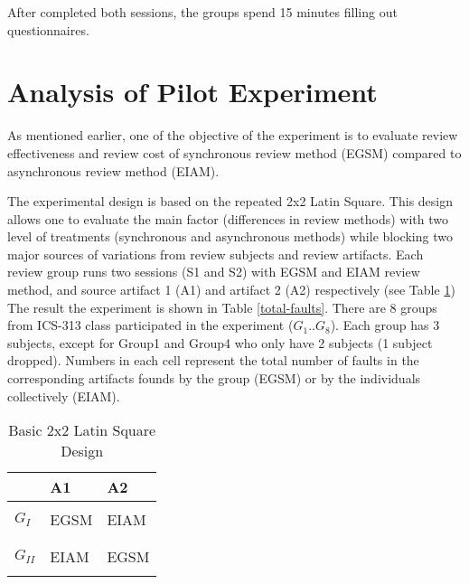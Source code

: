 After completed both sessions, the groups spend 15 minutes filling out
questionnaires. 



\section{Analysis of Pilot Experiment}
As mentioned earlier, one of the objective of the experiment is
to evaluate review effectiveness and review cost of synchronous review
method (EGSM) compared to asynchronous review method (EIAM).

The experimental design is based on the repeated 2x2 Latin Square. This
design allows one to evaluate the main factor (differences in review
methods) with two level of treatments (synchronous and asynchronous
methods) while blocking two major sources of variations from
review subjects and review artifacts. Each review group runs two
sessions (S1 and S2) with EGSM and EIAM review method, and source
artifact 1 (A1) and artifact 2 (A2) respectively (see Table
\ref{latin-square}) 
The result the experiment is shown in Table
\ref{total-faults}. There are 8 groups 
from ICS-313 class participated in the experiment ($G_1..G_8$). 
Each group has 3 subjects, except for Group1 and Group4 who only have
2 subjects (1 subject dropped).
Numbers in each cell represent the total number of faults in the
corresponding artifacts founds by the group (EGSM) or by the
individuals collectively (EIAM). 


\begin{table}[h]
  \begin{center}
    \begin{tabular} {|l|l|l|}
      \hline
      & {\bf A1} & {\bf A2}\\
      \hline
      & & \\
      {\bf $G_I$} & EGSM & EIAM \\
      & & \\
      \hline
      & & \\
      {\bf $G_{II}$} & EIAM & EGSM \\
      & &  \\
      \hline
     \end{tabular}
  \end{center}
  \caption{Basic 2x2 Latin Square Design}
  \label{latin-square}
\end{table}



